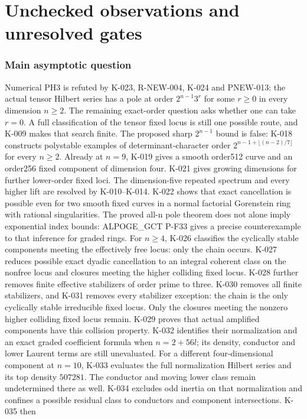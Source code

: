 \documentclass[11pt]{article}
\theoremstyle{definition}\newtheorem{definition}[theorem]{Definition}
\theoremstyle{remark}\newtheorem{remark}[theorem]{Remark}
\begin{document}
\part{Unchecked observations and unresolved gates}
\section{Main asymptotic question}
Numerical PH3 is refuted by K-023, R-NEW-004, K-024 and PNEW-013:
the actual tensor Hilbert series has a pole at order $2^{n-1}3^r$
for some $r\ge0$ in every dimension $n\ge2$. The remaining exact-order
question asks whether one can take $r=0$. A full classification of
the tensor fixed locus is still one possible route, and K-009 makes
that search finite. The proposed sharp $2^{n-1}$ bound is false:
K-018 constructs polystable examples of determinant-character order
$2^{n-1+\lfloor(n-2)/7\rfloor}$ for every $n\ge2$.
Already at $n=9$, K-019 gives a smooth order512 curve and an
order256 fixed component of dimension four. K-021 gives growing
dimensions for further lower-order fixed loci. The dimension-five
repeated spectrum and every higher lift are resolved by K-010--K-014.
K-022 shows that exact cancellation is possible even for two smooth
fixed curves in a normal factorial Gorenstein ring with rational
singularities. The proved all-n pole theorem does not alone imply
exponential index bounds: ALPOGE\_GCT P-F33 gives a precise
counterexample to that inference for graded rings. For $n\ge4$, K-026 classifies
the cyclically stable components meeting the effectively free locus:
only the chain occurs. K-027 reduces possible exact dyadic cancellation
to an integral coherent class on the nonfree locus and closures meeting
the higher colliding fixed locus. K-028 further removes finite
effective stabilizers of order prime to three. K-030 removes all finite
stabilizers, and K-031 removes every stabilizer exception: the chain is
the only cyclically stable irreducible fixed locus. Only the closures
meeting the nonzero higher colliding fixed locus remain. K-029 proves
that actual amplified components have this collision property.
K-032 identifies their normalization and an exact graded coefficient
formula when $n=2+56l$; its density, conductor and lower Laurent
terms are still unevaluated.
For a different four-dimensional component at $n=10$, K-033 evaluates
the full normalization Hilbert series and its top density $507281$.
The conductor and moving lower class remain undetermined there as well.
K-034 excludes odd inertia on that normalization and confines a possible
residual class to conductors and component intersections. K-035 then
\end{document}
